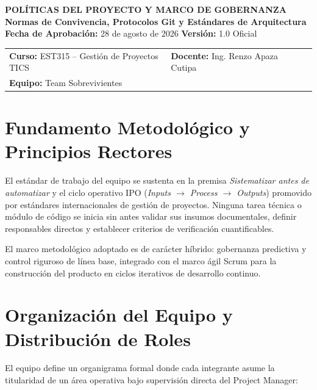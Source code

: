\documentclass[11pt,a4paper]{article}
\begin{document}

\begin{center}
    {\Large \textbf{\textcolor{AzulUNA}{POLÍTICAS DEL PROYECTO Y MARCO DE GOBERNANZA}}}\\[3pt]
    {\normalsize \textbf{Normas de Convivencia, Protocolos Git y Estándares de Arquitectura}}\\[4pt]
    \footnotesize \textbf{Fecha de Aprobación:} 28 de agosto de 2026 \quad \textbar\quad \textbf{Versión:} 1.0 Oficial
\end{center}

\vspace{0.1cm}

\noindent\begin{tabularx}{\textwidth}{@{}llXX@{}}
\toprule
\textbf{Curso:} EST315 -- Gestión de Proyectos TICS & \textbf{Docente:} Ing. Renzo Apaza Cutipa \\
\textbf{Equipo:} Team Sobrevivientes  \\
\bottomrule
\end{tabularx}

\vspace{0.3cm}

\section{Fundamento Metodológico y Principios Rectores}
El estándar de trabajo del equipo se sustenta en la premisa \textit{Sistematizar antes de automatizar} y el ciclo operativo IPO (\textit{Inputs $\rightarrow$ Process $\rightarrow$ Outputs}) promovido por estándares internacionales de gestión de proyectos. Ninguna tarea técnica o módulo de código se inicia sin antes validar sus insumos documentales, definir responsables directos y establecer criterios de verificación cuantificables.

El marco metodológico adoptado es de carácter híbrido: gobernanza predictiva y control riguroso de línea base, integrado con el marco ágil Scrum para la construcción del producto en ciclos iterativos de desarrollo continuo.

\section{Organización del Equipo y Distribución de Roles}
El equipo define un organigrama formal donde cada integrante asume la titularidad de un área operativa bajo supervisión directa del Project Manager:
\end{document}
